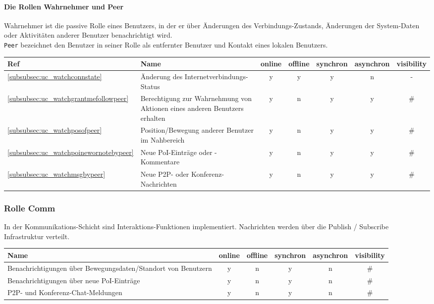 \paragraph{Die Rollen \textbf{Wahrnehmer} und \textbf{Peer}}
Wahrnehmer ist die passive Rolle eines Benutzers, in der er über Änderungen des Verbindungs-Zustands, Änderungen der System-Daten oder Aktivitäten anderer Benutzer benachrichtigt wird.\\
\texttt{Peer} bezeichnet den Benutzer in seiner Rolle als entfernter Benutzer und Kontakt eines lokalen Benutzers.\\
	\begin{table}[H]
		\centering
		\begin{tabulary}{\columnwidth}{|>{\centering}m{1cm}|L|C|C|C|C|C|}
		\hline
			\textbf{Ref} & \textbf{Name} & \textbf{online} & \textbf{offline} & \textbf{synchron} & \textbf{asynchron} & \textbf{visibility} \\ \hline
			\ref{subsubsec:uc_watchconnstate} & Änderung des Internetverbindungs-Status & y & y & y & n & - \\ \hline
			\ref{subsubsec:uc_watchgrantmefollowpeer} & Berechtigung zur Wahrnehmung von Aktionen eines anderen Benutzers erhalten & y & n & y & y & \# \\ \hline
			\ref{subsubsec:uc_watchposofpeer} & Position/Bewegung anderer Benutzer im Nahbereich & y & n & y & y & \# \\ \hline
			\ref{subsubsec:uc_watchpoinewornotebypeer} & Neue PoI-Einträge oder -Kommentare & y & n & y & y & \# \\ \hline
			\ref{subsubsec:uc_watchmsgbypeer} & Neue P2P- oder Konferenz-Nachrichten & y & n & y & y & \# \\ \hline
		\end{tabulary}
	\end{table}

\subsubsection{Rolle \textbf{Comm}}
In der Kommunikations-Schicht sind Interaktions-Funktionen implementiert. Nachrichten werden über die Publish / Subscribe Infrastruktur verteilt.\\
	\begin{table}[H]
		\centering
		\begin{tabulary}{\columnwidth}{|L|C|C|C|C|C|}
		\hline
			\textbf{Name} & \textbf{online} & \textbf{offline} & \textbf{synchron} & \textbf{asynchron} & \textbf{visibility} \\ \hline
			Benachrichtigungen über Bewegungsdaten/Standort von Benutzern & y & n & y & n & \# \\ \hline
			Benachrichtigungen über neue PoI-Einträge & y & n & y & n & \# \\ \hline
			P2P- und Konferenz-Chat-Meldungen & y & n & y & n & \# \\ \hline
		\end{tabulary}
	\end{table}

